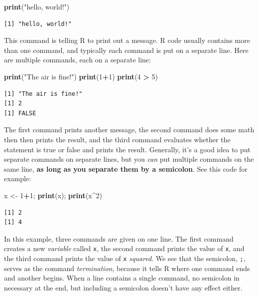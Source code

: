 \documentclass[
]{book}
\newenvironment{Shaded}{\begin{snugshade}}{\end{snugshade}}
\newcommand{\DecValTok}[1]{\textcolor[rgb]{0.00,0.00,0.81}{#1}}
\newcommand{\KeywordTok}[1]{\textcolor[rgb]{0.13,0.29,0.53}{\textbf{#1}}}
\newcommand{\NormalTok}[1]{#1}
\newcommand{\OperatorTok}[1]{\textcolor[rgb]{0.81,0.36,0.00}{\textbf{#1}}}
\newcommand{\StringTok}[1]{\textcolor[rgb]{0.31,0.60,0.02}{#1}}
\begin{document}
\begin{Shaded}
\begin{Highlighting}[]
\KeywordTok{print}\NormalTok{(}\StringTok{"hello, world!"}\NormalTok{)}
\end{Highlighting}
\end{Shaded}

\begin{verbatim}
[1] "hello, world!"
\end{verbatim}

This command is telling R to print out a message.
R code usually contains more than one command, and typically each command is put on a separate line.
Here are multiple commands, each on a separate line:

\begin{Shaded}
\begin{Highlighting}[]
\KeywordTok{print}\NormalTok{(}\StringTok{"The air is fine!"}\NormalTok{)}
\KeywordTok{print}\NormalTok{(}\DecValTok{1}\OperatorTok{+}\DecValTok{1}\NormalTok{)}
\KeywordTok{print}\NormalTok{(}\DecValTok{4} \OperatorTok{>}\StringTok{ }\DecValTok{5}\NormalTok{)}
\end{Highlighting}
\end{Shaded}

\begin{verbatim}
[1] "The air is fine!"
[1] 2
[1] FALSE
\end{verbatim}

The first command prints another message, the second command does some math then then prints the result, and the third command evaluates whether the statement is true or false and prints the result.
Generally, it's a good idea to put separate commands on separate lines, but you \emph{can} put multiple commands on the same line, \textbf{as long as you separate them by a semicolon}.
See this code for example:

\begin{Shaded}
\begin{Highlighting}[]
\NormalTok{x <-}\StringTok{ }\DecValTok{1}\OperatorTok{+}\DecValTok{1}\NormalTok{; }\KeywordTok{print}\NormalTok{(x); }\KeywordTok{print}\NormalTok{(x}\OperatorTok{^}\DecValTok{2}\NormalTok{)}
\end{Highlighting}
\end{Shaded}

\begin{verbatim}
[1] 2
[1] 4
\end{verbatim}

In this example, three commands are given on one line.
The first command creates a new \emph{variable} called \texttt{x}, the second command prints the value of \texttt{x}, and the third command prints the value of \texttt{x} \emph{squared}.
We see that the semicolon, \texttt{;}, serves as the command \emph{termination}, because it tells R where one command ends and another begins.
When a line contains a single command, no semicolon in necessary at the end, but including a semicolon doesn't have any effect either.
\end{document}
